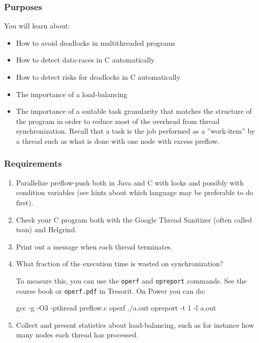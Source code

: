 \documentclass{forsete}
\begin{document}
\subsubsection*{Purposes}
You will learn about:
\begin{itemize}
\item How to avoid deadlocks in multithreaded programs
\item How to detect data-races in C automatically
\item How to detect risks for deadlocks in C automatically
\item The importance of a load-balancing
\item The importance of a suitable task granularity
that
matches the structure of the program in order to reduce most of the overhead from
thread synchronization.
Recall that a task is  the job performed as a ''work-item''
by a thread such as what is done with one node with excess preflow.
\end{itemize}

\subsubsection*{Requirements}
\begin{enumerate}
\item Parallelize preflow-push both in Java and C with locks and possibly with
condition variables (see hints about which language may be preferable to do first).

\item Check your C program both with
the Google Thread Sanitizer (often called tsan) and Helgrind. 

\item Print out a message when each thread terminates.

\item What fraction of the execution time is wasted on synchronization?

To measure this, you can use the \verb.operf. and \verb.opreport. commands. See the course book or
\verb!operf.pdf! in Tresorit. On Power you can do:
\begin{ccode}
gcc -g -O3 -pthread preflow.c
operf ./a.out
opreport -t 1 -l a.out
\end{ccode}

\item Collect and present statistics about load-balancing, such as
for instance how many nodes each thread has processed.
\end{enumerate}
\end{document}
